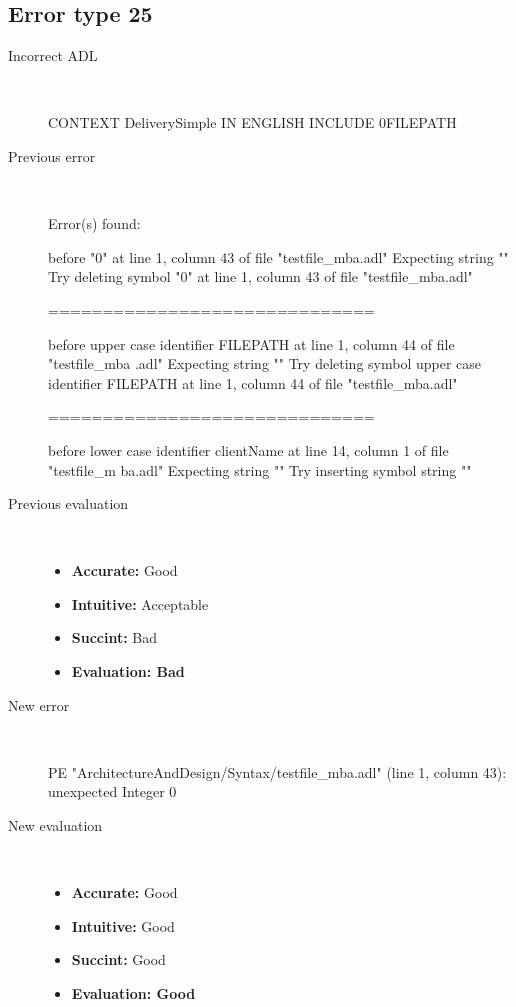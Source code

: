 \subsection{Error type 25}
  \begin{description}
  \item[Incorrect ADL]~\\
\begin{adl}
CONTEXT DeliverySimple IN ENGLISH INCLUDE 0FILEPATH\end{adl}
  \item[Previous error]~\\
\begin{haskell}
Error(s) found:

before "0" at line 1, column 43 of file "testfile_mba.adl"
Expecting string ""
Try deleting symbol "0" at line 1, column 43 of file "testfile_mba.adl"

==============================

before upper case identifier FILEPATH at line 1, column 44 of file "testfile_mba
.adl"
Expecting string ""
Try deleting symbol upper case identifier FILEPATH at line 1, column 44 of file
"testfile_mba.adl"

==============================

before lower case identifier clientName at line 14, column 1 of file "testfile_m
ba.adl"
Expecting string ""
Try inserting symbol string ""
\end{haskell}
  \item[Previous evaluation]~\\
    \begin{itemize}
    \item \textbf{Accurate:} Good
    \item \textbf{Intuitive:} Acceptable
    \item \textbf{Succint:} Bad
    \item \textbf{Evaluation: Bad}
    \end{itemize}
  \item[New error]~\\
\begin{haskell}
PE "ArchitectureAndDesign/Syntax/testfile_mba.adl" (line 1, column 43):
unexpected Integer 0\end{haskell}
  \item[New evaluation]~\\
    \begin{itemize}
    \item \textbf{Accurate:} Good
    \item \textbf{Intuitive:} Good
    \item \textbf{Succint:} Good
    \item \textbf{Evaluation: Good
}
    \end{itemize}
  \end{description}


